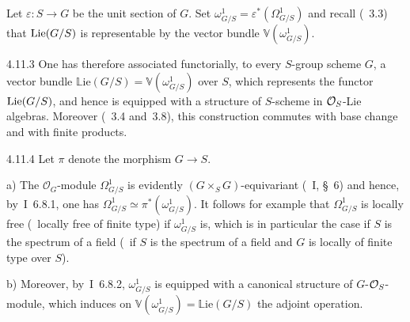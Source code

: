 Let \(\varepsilon\colon S\to G\) be the unit section of \(G\). Set
\(\omega^1_{G/S}=\varepsilon^*(\Omega^1_{G/S})\) and recall (\cf~3.3) that
\(\operatorname{Lie}(G/S)\) is representable by the vector bundle
\(\mathbb{V}(\omega^1_{G/S})\).

\begin{scholium}{4.11.3}
\label{II.4.11.3}
One has therefore associated functorially, to every \(S\)-group scheme \(G\),
a vector bundle \(\mathbb{L}\mathrm{ie}(G/S)=\mathbb{V}(\omega^1_{G/S})\)
over \(S\), which represents the functor \(\operatorname{Lie}(G/S)\), and hence is equipped
with a structure of \(S\)-scheme in \(\mathcal{O}_S\)-Lie algebras. Moreover
(\cf~3.4 and~3.8), this construction commutes with base change and with
finite products.
\end{scholium}

\begin{remarks}{4.11.4}
\label{II.4.11.4}
{\renewcommand{\thefootnote}{(86)}}
Let \(\pi\) denote the morphism \(G\to S\).

a) The \(\mathcal{O}_G\)-module \(\Omega^1_{G/S}\) is evidently
\((G\times_S G)\)-equivariant (\cf~I, \S~6) and hence, by~I~6.8.1, one has
\(\Omega^1_{G/S}\simeq\pi^*(\omega^1_{G/S})\). It follows for example that
\(\Omega^1_{G/S}\) is locally free (\resp\ locally free of finite type) if
\(\omega^1_{G/S}\) is, which is in particular the case if \(S\) is the
spectrum of a field (\resp\ if \(S\) is the spectrum of a field and \(G\) is
locally of finite type over \(S\)).

b) Moreover, by~I~6.8.2, \(\omega^1_{G/S}\) is equipped with a canonical
structure of \(G\)-\(\mathcal{O}_S\)-module, which induces on
\(\mathbb{V}(\omega^1_{G/S})=\mathbb{L}\mathrm{ie}(G/S)\) the adjoint
operation.{\renewcommand{\thefootnote}{(87)}}


\end{remarks}
